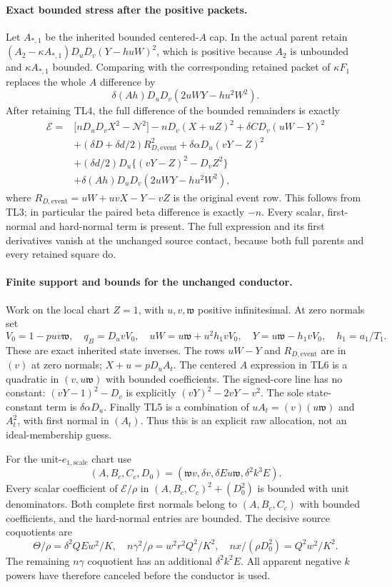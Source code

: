 \paragraph{Exact bounded stress after the positive packets.}
Let $A_{*,1}$ be the inherited bounded centered-$A$ cap. In the actual
parent retain $(A_2-\kappa A_{*,1})D_uD_v(Y-huW)^2$, which is positive
because $A_2$ is unbounded and $\kappa A_{*,1}$ bounded. Comparing with
the corresponding retained packet of $\kappa F_1$ replaces the whole
$A$ difference by
\[
 \delta(Ah)D_uD_v(2uWY-hu^2W^2).
\]
After retaining TL4, the full difference of the bounded remainders is
exactly
\[
\begin{split}
 \mathscr E={}&\bigl[nD_uD_vX^2-\mathcal N^2\bigr]
   -nD_v(X+uZ)^2+\delta C D_v(uW-Y)^2\\
 &+(\delta D+\delta d/2)R_{D,\mathrm{event}}^2
   +\delta\alpha D_u(vY-Z)^2\\
 &+(\delta d/2)D_u\{(vY-Z)^2-D_vZ^2\}\\
 &+\delta(Ah)D_uD_v(2uWY-hu^2W^2),
\end{split}
\tag{TL6}
\]
where $R_{D,\mathrm{event}}=uW+uvX-Y-vZ$ is the original event
row. This follows from TL3; in particular the paired beta difference
is exactly $-n$. Every scalar, first-normal and hard-normal term is
present. The full expression and its first derivatives vanish at the
unchanged source contact, because both full parents and every retained
square do.

\paragraph{Finite support and bounds for the unchanged conductor.}
Work on the local chart $Z=1$, with $u,v,\mathfrak w$ positive
infinitesimal. At zero normals set
\[
 V_0=1-puv\mathfrak w,\quad q_B=D_uvV_0,\quad
 uW=u\mathfrak w+u^2h_1vV_0,\quad
 Y=u\mathfrak w-h_1vV_0,\quad h_1=a_1/T_1.
\tag{TL7}
\]
These are exact inherited state inverses. The rows $uW-Y$ and
$R_{D,\mathrm{event}}$ are in $(v)$ at zero normals;
$X+u=pD_uA_t$. The centered $A$ expression in TL6 is a quadratic
in $(v,u\mathfrak w)$ with bounded coefficients. The signed-core
line has no constant: $(vY-1)^2-D_v$ is explicitly
$(vY)^2-2vY-v^2$. The sole state-constant term is
$\delta\alpha D_u$. Finally TL5 is a combination of
$uA_t=(v)(u\mathfrak w)$ and $A_t^2$, with first normal in $(A_t)$.
Thus this is an explicit raw allocation, not an ideal-membership guess.

For the unit-$e_{1,\mathrm{scale}}$ chart use
\[
 (A,B_c,C_c,D_0)
 =(\mathfrak wv,\delta v,\delta E u\mathfrak w,\delta^2k^3E).
\]
Every scalar coefficient of $\mathscr E/\rho$ in
$(A,B_c,C_c)^2+(D_0^2)$ is bounded with unit denominators. Both complete
first normals belong to $(A,B_c,C_c)$ with bounded coefficients, and
the hard-normal entries are bounded. The decisive source coquotients
are
\[
 \Theta/\rho=\delta^2QEw^2/K,\quad
 n\gamma^2/\rho=w^2r^2Q^2/K^2,\quad
 nx/(\rho D_0^2)=Q^2w^2/K^2.
\tag{TL8}
\]
The remaining $n\gamma$ coquotient has an additional $\delta^2k^2E$.
All apparent negative $k$ powers have therefore canceled before the
conductor is used.

